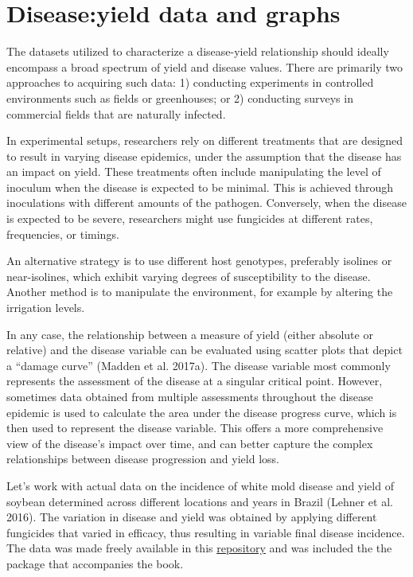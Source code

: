 \documentclass[
  letterpaper,
  DIV=11,
  numbers=noendperiod]{scrreprt}
\begin{document}
\hypertarget{diseaseyield-data-and-graphs}{%
\section{Disease:yield data and
graphs}\label{diseaseyield-data-and-graphs}}

The datasets utilized to characterize a disease-yield relationship
should ideally encompass a broad spectrum of yield and disease values.
There are primarily two approaches to acquiring such data: 1) conducting
experiments in controlled environments such as fields or greenhouses; or
2) conducting surveys in commercial fields that are naturally infected.

In experimental setups, researchers rely on different treatments that
are designed to result in varying disease epidemics, under the
assumption that the disease has an impact on yield. These treatments
often include manipulating the level of inoculum when the disease is
expected to be minimal. This is achieved through inoculations with
different amounts of the pathogen. Conversely, when the disease is
expected to be severe, researchers might use fungicides at different
rates, frequencies, or timings.

An alternative strategy is to use different host genotypes, preferably
isolines or near-isolines, which exhibit varying degrees of
susceptibility to the disease. Another method is to manipulate the
environment, for example by altering the irrigation levels.

In any case, the relationship between a measure of yield (either
absolute or relative) and the disease variable can be evaluated using
scatter plots that depict a ``damage curve'' (Madden et al. 2017a). The
disease variable most commonly represents the assessment of the disease
at a singular critical point. However, sometimes data obtained from
multiple assessments throughout the disease epidemic is used to
calculate the area under the disease progress curve, which is then used
to represent the disease variable. This offers a more comprehensive view
of the disease's impact over time, and can better capture the complex
relationships between disease progression and yield loss.

Let's work with actual data on the incidence of white mold disease and
yield of soybean determined across different locations and years in
Brazil (Lehner et al. 2016). The variation in disease and yield was
obtained by applying different fungicides that varied in efficacy, thus
resulting in variable final disease incidence. The data was made freely
available in this
\href{https://github.com/emdelponte/paper-white-mold-meta-analysis}{repository}
and was included the the package that accompanies the book.
\end{document}
